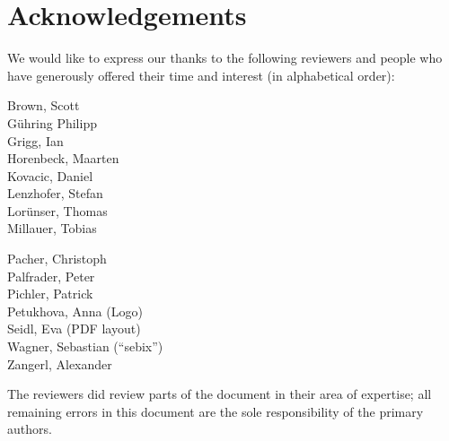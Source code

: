 \newpage
\section{Acknowledgements}
\label{section:Reviewers}



We would like to express our thanks to the following reviewers and people who have generously offered their time and interest (in alphabetical order):


\vline{}

\begin{minipage}[b]{0.5\linewidth}
\center
Brown, Scott \\
G\"uhring Philipp  \\
Grigg, Ian  \\
Horenbeck, Maarten \\
Kovacic, Daniel \\
Lenzhofer, Stefan \\
Lor\"unser, Thomas \\
Millauer, Tobias \\
\end{minipage}
\begin{minipage}[b]{0.5\linewidth}
\center
Pacher, Christoph \\
Palfrader, Peter \\
Pichler, Patrick \\
Petukhova, Anna (Logo) \\
Seidl, Eva (PDF layout) \\
Wagner, Sebastian (``sebix'') \\
Zangerl, Alexander \\
\end{minipage}

\vline{}

The reviewers did review parts of the document in their area of
expertise; all remaining errors in this document are the sole
responsibility of the primary authors.



